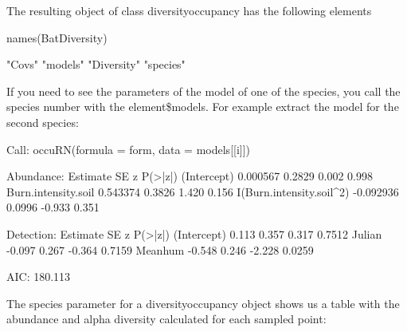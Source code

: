 \documentclass[article]{jss}
\begin{document}
The resulting object of class diversityoccupancy has the following
elements

\begin{CodeChunk}
\begin{CodeInput}
names(BatDiversity)
\end{CodeInput}
\begin{CodeOutput}
[1] "Covs"      "models"    "Diversity" "species"  
\end{CodeOutput}
\end{CodeChunk}

If you need to see the parameters of the model of one of the species,
you call the species number with the element\$models. For example
extract the model for the second species:

\begin{CodeChunk}
\begin{CodeOutput}

Call:
occuRN(formula = form, data = models[[i]])

Abundance:
                          Estimate     SE      z P(>|z|)
(Intercept)               0.000567 0.2829  0.002   0.998
Burn.intensity.soil       0.543374 0.3826  1.420   0.156
I(Burn.intensity.soil^2) -0.092936 0.0996 -0.933   0.351

Detection:
            Estimate    SE      z P(>|z|)
(Intercept)    0.113 0.357  0.317  0.7512
Julian        -0.097 0.267 -0.364  0.7159
Meanhum       -0.548 0.246 -2.228  0.0259

AIC: 180.113 
\end{CodeOutput}
\end{CodeChunk}

The species parameter for a diversityoccupancy object shows us a table with the abundance and alpha diversity calculated for each sampled point:
\end{document}

